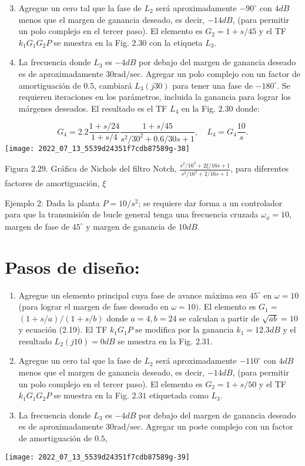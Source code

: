 \begin{enumerate}
  \setcounter{enumi}{2}
  \item Agregue un cero tal que la fase de $L_{2}$ será aproximadamente $-90^{\circ}$ con $4 d B$ menos que el margen de ganancia deseado, es decir, $-14 d B$, (para permitir un polo complejo en el tercer paso). El elemento es $G_{2}=1+s / 45$ y el TF $k_{1} G_{1} G_{2} P$ se muestra en la Fig. $2.30$ con la etiqueta $L_{3}$.

  \item La frecuencia donde $L_{3}$ es $-4 d B$ por debajo del margen de ganancia deseado es de aproximadamente $30 \mathrm{rad} / \mathrm{sec}$. Agregar un polo complejo con un factor de amortiguación de $0.5$, cambiará $L_{3}(j 30)$ para tener una fase de $-180^{\circ}$. Se requieren iteraciones en los parámetros, incluida la ganancia para lograr los márgenes deseados. El resultado es el TF $L_{4}$ en la Fig. $2.30$ donde:

\end{enumerate}
$$
G_{4}=2.2 \frac{1+s / 24}{1+s / 4} \frac{1+s / 45}{s^{2} / 30^{2}+0.6 / 30 s+1}, \quad L_{4}=G_{4} \frac{10}{s} .
$$
\texttt{[image: 2022\_07\_13\_5539d24351f7cdb87589g-38]}

Figura 2.29. Gráfica de Nichols del filtro Notch, $\frac{s^{2} / 16^{2}+2 \xi / 16 s+1}{s^{2} / 16^{2}+2 / 16 s+1}$, para diferentes factores de amortiguación, $\xi$

Ejemplo 2: Dada la planta $P=10 / s^{2}$; se requiere dar forma a un controlador para que la transmisión de bucle general tenga una frecuencia cruzada $\omega_{\phi}=10$, margen de fase de $45^{\circ}$ y margen de ganancia de $10 d B$.

\section{Pasos de diseño:}
\begin{enumerate}
  \item Agregue un elemento principal cuya fase de avance máxima sea $45^{\circ}$ en $\omega=10$ (para lograr el margen de fase deseado en $\omega=10)$. El elemento es $G_{1}=$ $(1+s / a) /(1+s / b)$ donde $a=4, b=24$ se calculan a partir de $\sqrt{a b}=10$ y ecuación (2.19). El TF $k_{1} G_{1} P$ se modifica por la ganancia $k_{1}=12.3 d B$ y el resultado $L_{2}(j 10)=0 d B$ se muestra en la Fig. 2.31.

  \item Agregue un cero tal que la fase de $L_{2}$ será aproximadamente $-110^{\circ}$ con $4 d B$ menos que el margen de ganancia deseado, es decir, $-14 d B$, (para permitir un polo complejo en el tercer paso). El elemento es $G_{2}=1+s / 50$ y el TF $k_{1} G_{1} G_{2} P$ se muestra en la Fig. $2.31$ etiquetada como $L_{3}$.

  \item La frecuencia donde $L_{3}$ es $-4 d B$ por debajo del margen de ganancia deseado es de aproximadamente $30 \mathrm{rad} / \mathrm{sec}$. Agregar un poste complejo con un factor de amortiguación de $ 0.5 $,

\end{enumerate}
\texttt{[image: 2022\_07\_13\_5539d24351f7cdb87589g-39]}

